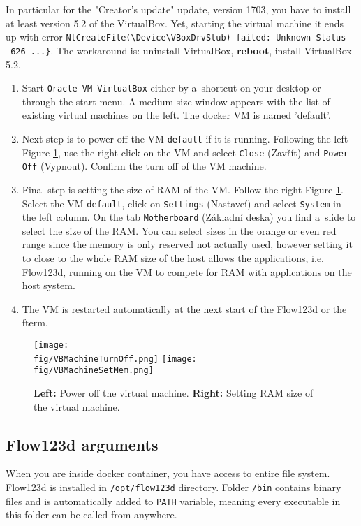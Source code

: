 In particular for the "Creator's update" update, version 1703, you have to install at least version 5.2 
of the VirtualBox. Yet, starting the virtual machine it ends up with error \verb'NtCreateFile(\Device\VBoxDrvStub) failed: Unknown Status -626 ...}'. The workaround is:
uninstall VirtualBox, {\bf reboot}, install VirtualBox 5.2.  

 
\begin{enumerate}
 \item Start \verb'Oracle VM VirtualBox' either by a~shortcut on your desktop or through the start menu. 
 A medium size window appears with the list of existing virtual machines 
 on the left. The docker VM is named 'default'.
 \item Next step is to power off the VM \verb'default' if it is running. 
 Following the left Figure \ref{fig:vm_ram_setup}, use the right-click on the VM and select \verb'Close' (Zav\v r\' it) and 
 \verb'Power Off' (Vypnout). Confirm the turn off of the VM machine. 
 \item Final step is setting the size of RAM of the VM. Follow the right Figure \ref{fig:vm_ram_setup}. 
 Select the VM \verb'default', click on \verb'Settings' (Nastave\' i) and select \verb'System' in the left column.
 On the tab \verb'Motherboard' (Z\' akladn\' i deska) you find a~slide to select the size of the RAM. You can select sizes  
 in the orange or even red range since the memory is only reserved not actually used, however setting it to close to the 
 whole RAM size of the host allows the applications, i.e. Flow123d, running on the VM to compete for RAM with applications on the host system.
 \item The VM is restarted automatically at the next start of the Flow123d or the fterm.
\end{enumerate}


\begin{figure}
    \center  
    \texttt{[image: \\fig/VBMachineTurnOff.png]}
    \hspace{2ex}
    \texttt{[image: \\fig/VBMachineSetMem.png]}
    \caption{{\bf Left:} Power off the virtual machine.
             {\bf Right:} Setting RAM size of the virtual machine.} 
    \label{fig:vm_ram_setup}
\end{figure}

\subsection{Flow123d arguments}
When you are inside docker container, you have access to entire file system. Flow123d is installed in 
\verb'/opt/flow123d' directory. Folder \verb'/bin' contains binary files and is automatically 
added to \verb'PATH' variable, meaning every executable in this folder can be called from anywhere.


